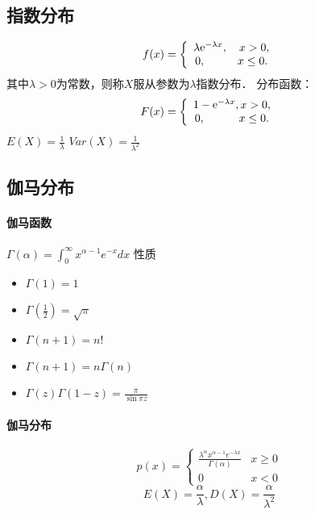 \subsection{指数分布}
$$f(x) = \left\{ {\begin{array}{*{20}{c}}
                {\lambda {{\rm{e}}^{ - \lambda x}},\quad x > 0,} \\
                {0,\quad \quad \;\;\;x \le 0.}
            \end{array}} \right.$$
其中$\lambda>0$为常数，则称$X$服从参数为$\lambda$指数分布．
分布函数：
$$F(x) = \left\{ {\begin{array}{*{20}{c}}
                {1 - {{\rm{e}}^{ - \lambda x}},x > 0,} \\
                {0,\quad \quad \quad {\rm{  }}x \le 0.}
            \end{array}} \right.$$
$E(X) = \frac{1}{\lambda }$
$Var(X)= \frac{1}{{{\lambda ^2}}}$

\subsection{伽马分布}

\paragraph{伽马函数} $\Gamma (\alpha ) = \int_0^\infty  {{x^{\alpha  - 1}}} {e^{ - x}}dx$
性质
\begin{itemize}
    \item $\Gamma (1) = 1$
    \item $\Gamma (\frac{1}{2}) = \sqrt \pi  $
    \item $\Gamma (n + 1) = n!$
    \item $\Gamma(n+1) = n \Gamma(n)$
    \item $\Gamma(z)\Gamma(1-z)=\frac{\pi}{\sin \pi z}$
\end{itemize}


\paragraph{伽马分布}
$$p(x) = \left\{ {\begin{array}{*{20}{c}}
                {\frac{{{\lambda ^\alpha }{x^{\alpha  - 1}}{e^{ - \lambda x}}}}{{\Gamma (\alpha )}}} & {x \geqslant 0} \\
                0                                                                                    & {x < 0}
            \end{array}} \right.$$
$$E(X) = \frac{\alpha }{\lambda },D(X) = \frac{\alpha }{{{\lambda ^2}}}$$

